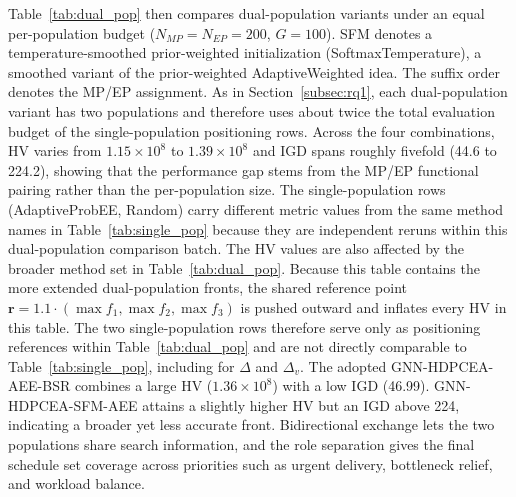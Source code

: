 \documentclass[pdflatex,iicol,Numbered,sn-basic]{sn-jnl}
\begin{document}
Table~\ref{tab:dual_pop} then compares dual-population variants under an equal per-population budget ($N_{MP}=N_{EP}=200$, $G=100$). SFM denotes a temperature-smoothed prior-weighted initialization (SoftmaxTemperature), a smoothed variant of the prior-weighted AdaptiveWeighted idea. The suffix order denotes the MP/EP assignment. As in Section~\ref{subsec:rq1}, each dual-population variant has two populations and therefore uses about twice the total evaluation budget of the single-population positioning rows.
Across the four combinations, HV varies from $1.15\times10^8$ to $1.39\times10^8$ and IGD spans roughly fivefold (44.6 to 224.2), showing that the performance gap stems from the MP/EP functional pairing rather than the per-population size. The single-population rows (AdaptiveProbEE, Random) carry different metric values from the same method names in Table~\ref{tab:single_pop} because they are independent reruns within this dual-population comparison batch. The HV values are also affected by the broader method set in Table~\ref{tab:dual_pop}. Because this table contains the more extended dual-population fronts, the shared reference point $\mathbf{r}=1.1\cdot(\max f_1,\max f_2,\max f_3)$ is pushed outward and inflates every HV in this table. The two single-population rows therefore serve only as positioning references within Table~\ref{tab:dual_pop} and are not directly comparable to Table~\ref{tab:single_pop}, including for $\Delta$ and $\Delta_v$.
The adopted GNN-HDPCEA-AEE-BSR combines a large HV ($1.36\times10^8$) with a low IGD (46.99). GNN-HDPCEA-SFM-AEE attains a slightly higher HV but an IGD above 224, indicating a broader yet less accurate front. Bidirectional exchange lets the two populations share search information, and the role separation gives the final schedule set coverage across priorities such as urgent delivery, bottleneck relief, and workload balance.
\end{document}
